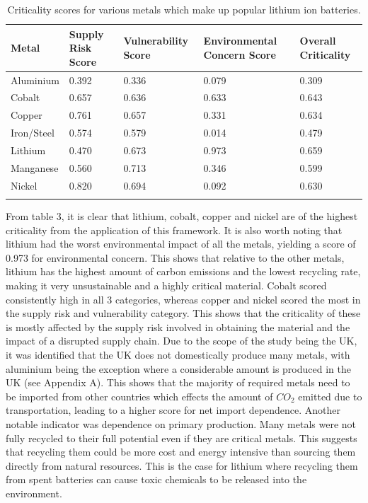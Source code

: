 \documentclass{article}
\begin{document}
\newpage
\begin{longtable}{| p{} | p{} | p{} |p{} |p{} |}
\hline

Metal & Supply Risk Score & Vulnerability Score & 
Environmental Concern Score & Overall Criticality\\\hline
{Aluminium} & {0.392} &{0.336}& {0.079}& {0.309} \\\hline
{Cobalt} & {0.657}& {0.636}&{0.633}& {0.643}\\\hline
{Copper} &  {0.761}& {0.657}& {0.331}& {0.634}\\\hline
{Iron/Steel} &{0.574}& {0.579}& {0.014}& {0.479}\\\hline
{Lithium} &  {0.470} &{0.673} &{0.973} &{0.659} \\\hline
{Manganese} &  {0.560} &{0.713} &{0.346} &{0.599}\\\hline
{Nickel} &  {0.820} &{0.694} &{0.092} &{0.630}\\\hline

\caption{Criticality scores for various metals which make up popular lithium ion batteries.}
\end{longtable}

From table 3, it is clear that lithium, cobalt, copper and nickel are of the highest criticality from the application of this framework. It is also worth noting that lithium had the worst environmental impact of all the metals, yielding a score of 0.973 for environmental concern. This shows that relative to the other metals, lithium has the highest amount of carbon emissions and the lowest recycling rate, making it very unsustainable and a highly critical material. Cobalt scored consistently high in all 3 categories, whereas copper and nickel scored the most in the supply risk and vulnerability category. This shows that the criticality of these is mostly affected by the supply risk involved in obtaining the material and the impact of a disrupted supply chain. Due to the scope of the study being the UK, it was identified that the UK does not domestically produce many metals, with aluminium being the exception where a considerable amount is produced in the UK (see Appendix A). This shows that the majority of required metals need to be imported from other countries which effects the amount of $CO_{2}$ emitted due to transportation, leading to a higher score for net import dependence. Another notable indicator was dependence on primary production. Many metals were not fully recycled to their full potential even if they are critical metals. This suggests that recycling them could be more cost and energy intensive than sourcing them directly from natural resources. This is the case for lithium where recycling them from spent batteries can cause toxic chemicals to be released into the environment. 
\end{document}
